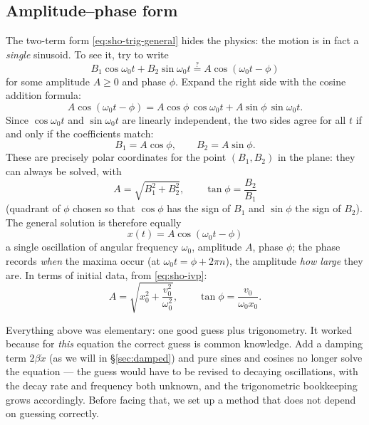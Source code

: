 \documentclass[11pt]{article}
\theoremstyle{plain}
\theoremstyle{definition}
\theoremstyle{remark}
\begin{document}
\subsection{Amplitude--phase form}
\label{sec:sho-forms}

The two-term form \eqref{eq:sho-trig-general} hides the physics: the motion
is in fact a \emph{single} sinusoid. To see it, try to write
\begin{equation}
  B_1\cos\omega_0 t + B_2 \sin\omega_0 t
  \overset{?}{=} A\cos(\omega_0 t - \phi)
\end{equation}
for some amplitude $A\ge0$ and phase $\phi$. Expand the right side with the
cosine addition formula:
\begin{equation}
  A\cos(\omega_0 t - \phi)
  = A\cos\phi\,\cos\omega_0 t + A\sin\phi\,\sin\omega_0 t .
\end{equation}
Since $\cos\omega_0 t$ and $\sin\omega_0 t$ are linearly independent, the two
sides agree for all $t$ if and only if the coefficients match:
\begin{equation}
  B_1 = A\cos\phi,
  \qquad
  B_2 = A\sin\phi .
  \label{eq:AB-dictionary}
\end{equation}
These are precisely polar coordinates for the point $(B_1,B_2)$ in the plane:
they can always be solved, with
\begin{equation}
  \boxed{\;
  A = \sqrt{B_1^2 + B_2^2},
  \qquad
  \tan\phi = \frac{B_2}{B_1}
  \;}
\end{equation}
(quadrant of $\phi$ chosen so that $\cos\phi$ has the sign of $B_1$ and
$\sin\phi$ the sign of $B_2$). The general solution is therefore equally
\begin{equation}
  \boxed{\;
  x(t) = A\cos(\omega_0 t - \phi)
  \;}
  \label{eq:sho-general}
\end{equation}
a single oscillation of angular frequency $\omega_0$, amplitude $A$, phase
$\phi$; the phase records \emph{when} the maxima occur (at
$\omega_0 t = \phi + 2\pi n$), the amplitude \emph{how large} they are. In
terms of initial data, from \eqref{eq:sho-ivp}:
\begin{equation}
  A = \sqrt{x_0^2 + \frac{v_0^2}{\omega_0^2}},
  \qquad
  \tan\phi = \frac{v_0}{\omega_0 x_0} .
\end{equation}

Everything above was elementary: one good guess plus trigonometry. It
worked because for \emph{this} equation the
correct guess is common knowledge. Add a damping term $2\beta\dot x$ (as we
will in \S\ref{sec:damped}) and pure sines and cosines no longer solve the
equation --- the guess would have to be revised to decaying oscillations,
with the decay rate and frequency both unknown, and the trigonometric
bookkeeping grows accordingly. Before facing that, we set up a method that
does not depend on guessing correctly.
\end{document}
